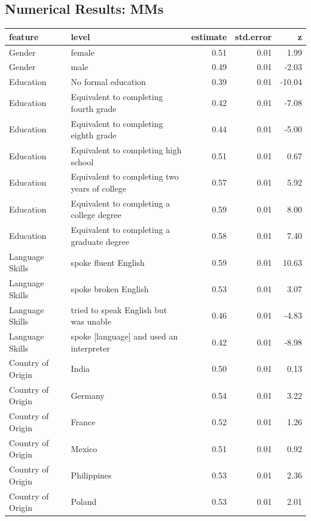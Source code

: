 \documentclass[a4paper,12pt]{article}\usepackage[]{graphicx}\usepackage[]{color}
\begin{document}
\clearpage

\subsection{Numerical Results: MMs}

\begin{table}[ht]
\centering
\begingroup\scriptsize
\begin{tabular}{lp{3in}rrr}
  \hline
feature & level & estimate & std.error & z \\ 
  \hline
Gender & female & 0.51 & 0.01 & 1.99 \\ 
  Gender & male & 0.49 & 0.01 & -2.03 \\ 
  Education & No formal education & 0.39 & 0.01 & -10.04 \\ 
  Education & Equivalent to completing fourth grade & 0.42 & 0.01 & -7.08 \\ 
  Education & Equivalent to completing eighth grade & 0.44 & 0.01 & -5.00 \\ 
  Education & Equivalent to completing high school & 0.51 & 0.01 & 0.67 \\ 
  Education & Equivalent to completing two years of college & 0.57 & 0.01 & 5.92 \\ 
  Education & Equivalent to completing a college degree & 0.59 & 0.01 & 8.00 \\ 
  Education & Equivalent to completing a graduate degree & 0.58 & 0.01 & 7.40 \\ 
  Language Skills & spoke fluent English & 0.59 & 0.01 & 10.63 \\ 
  Language Skills & spoke broken English & 0.53 & 0.01 & 3.07 \\ 
  Language Skills & tried to speak English but was unable & 0.46 & 0.01 & -4.83 \\ 
  Language Skills & spoke [language] and used an interpreter & 0.42 & 0.01 & -8.98 \\ 
  Country of Origin & India & 0.50 & 0.01 & 0.13 \\ 
  Country of Origin & Germany & 0.54 & 0.01 & 3.22 \\ 
  Country of Origin & France & 0.52 & 0.01 & 1.26 \\ 
  Country of Origin & Mexico & 0.51 & 0.01 & 0.92 \\ 
  Country of Origin & Philippines & 0.53 & 0.01 & 2.36 \\ 
  Country of Origin & Poland & 0.53 & 0.01 & 2.01 \\ 

\end{tabular}
\end{table}
\end{document}
